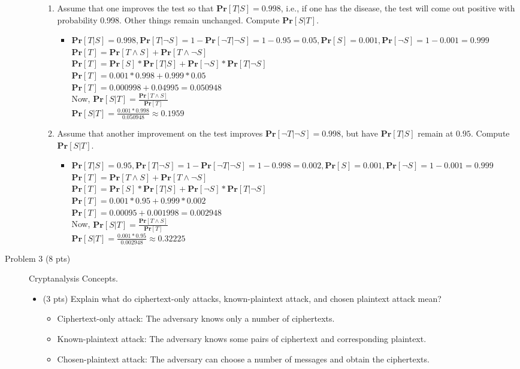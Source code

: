 \documentclass[11pt]{article}
\renewcommand{\Pr}{\ensuremath{\mathbf{Pr}}\xspace}
\begin{document}
\begin{description}
\begin{enumerate}
\begin{enumerate}
 \item
Assume that one improves the test so that $\Pr[T|S]=0.998$, i.e., if one has the disease, the test will come out positive with probability 0.998.  Other things remain unchanged.  Compute  $\Pr[S|T]$.
	\begin{itemize}
	\item
	$\Pr[T|S]=0.998, \Pr[T | \neg S]= 1 - \Pr[\neg T| \neg S] = 1 - 0.95 = 0.05, \Pr[S]=0.001, \Pr[\neg S] = 1 - 0.001 = 0.999$ \\
	$\Pr[T] = \Pr[T \wedge S] + \Pr[T \wedge \neg S]$ \\
	$\Pr[T] = \Pr[S] * \Pr[T | S] + \Pr[\neg S] * \Pr[T | \neg S] $ \\
	$\Pr[T] = 0.001 * 0.998 + 0.999 * 0.05 $ \\
	$\Pr[T] = 0.000998 + 0.04995 = 0.050948$ \\
	Now, $\Pr[S|T] = \frac{ \Pr[T \wedge S]}{\Pr[T]}$ \\
	$\Pr[S|T] = \frac{0.001*0.998}{0.050948} \approx 0.1959$
	\end{itemize}
 \item
Assume that another improvement on the test improves $\Pr[\neg T| \neg S]=0.998$, but have $\Pr[T|S]$ remain at $0.95$.  Compute $\Pr[S|T]$.
	\begin{itemize}
	\item
	$\Pr[T|S]=0.95, \Pr[T | \neg S]= 1 - \Pr[\neg T| \neg S] = 1 - 0.998 = 0.002, \Pr[S]=0.001, \Pr[\neg S] = 1 - 0.001 = 0.999$ \\
	$\Pr[T] = \Pr[T \wedge S] + \Pr[T \wedge \neg S]$ \\
	$\Pr[T] = \Pr[S] * \Pr[T | S] + \Pr[\neg S] * \Pr[T | \neg S] $ \\
	$\Pr[T] = 0.001 * 0.95 + 0.999 * 0.002 $ \\
	$\Pr[T] = 0.00095 + 0.001998 = 0.002948$ \\
	Now, $\Pr[S|T] = \frac{ \Pr[T \wedge S]}{\Pr[T]}$ \\
	$\Pr[S|T] = \frac{0.001*0.95}{0.002948} \approx 0.32225$ \\
	\end{itemize}
\end{enumerate}

\end{enumerate}

 \item[Problem 3 (8 pts)] Cryptanalysis Concepts.
\begin{itemize}
 \item (3 pts)
Explain what do ciphertext-only attacks, known-plaintext attack, and chosen plaintext
attack mean?
	\begin{itemize}
	\item
	Ciphertext-only attack: The adversary knows only a number of ciphertexts. 
	\item
	Known-plaintext attack: The adversary knows some pairs of ciphertext and corresponding plaintext.
	\item
	Chosen-plaintext attack: The adversary can choose a number of messages and obtain the ciphertexts.
	\end{itemize}


\end{itemize}
\end{description}
\end{document}
